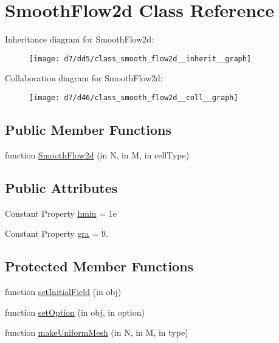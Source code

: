 \hypertarget{class_smooth_flow2d}{}\section{Smooth\+Flow2d Class Reference}
\label{class_smooth_flow2d}


Inheritance diagram for Smooth\+Flow2d\+:
\nopagebreak
\begin{figure}[H]
\begin{center}
\leavevmode
\texttt{[image: d7/dd5/class\_smooth\_flow2d\_\_inherit\_\_graph]}
\end{center}
\end{figure}


Collaboration diagram for Smooth\+Flow2d\+:
\nopagebreak
\begin{figure}[H]
\begin{center}
\leavevmode
\texttt{[image: d7/d46/class\_smooth\_flow2d\_\_coll\_\_graph]}
\end{center}
\end{figure}
\subsection*{Public Member Functions}
\begin{DoxyCompactItemize}
\item 
function \hyperlink{class_smooth_flow2d_af948f35ee3c33fb06475310750eb2ac9}{Smooth\+Flow2d} (in N, in M, in cell\+Type)
\end{DoxyCompactItemize}
\subsection*{Public Attributes}
\begin{DoxyCompactItemize}
\item 
Constant Property \hyperlink{class_smooth_flow2d_a1b361918678d82b9245ba5224f9117a7}{hmin} = 1e
\item 
Constant Property \hyperlink{class_smooth_flow2d_ad3528efb7da46f47475ff7d0e4a75c09}{gra} = 9.
\end{DoxyCompactItemize}
\subsection*{Protected Member Functions}
\begin{DoxyCompactItemize}
\item 
function \hyperlink{class_smooth_flow2d_a57d2b96de6e03be2ac074bfac9ff2ffe}{set\+Initial\+Field} (in obj)
\item 
function \hyperlink{class_smooth_flow2d_a1cdc505b18757da2edd71bea4d1af21b}{set\+Option} (in obj, in option)
\item 
function \hyperlink{class_smooth_flow2d_a53608135bf6fbbc27a66fb09b6693480}{make\+Uniform\+Mesh} (in N, in M, in type)
\end{DoxyCompactItemize}



